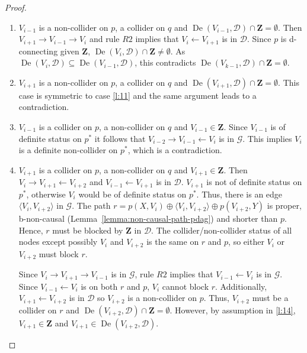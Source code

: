\documentclass[letterpaper]{article}
\theoremstyle{definition}
\theoremstyle{remark}
\DeclareMathOperator{\De}{De}
\newcommand{\g}[1][G]{\mathcal{#1}}
\newcommand{\pstar}[1][p]{{#1}^{*}}
\begin{document}
\begin{proof}
\begin{enumerate}[label=(\arabic*)]
\item\label{l:11}  $V_{i-1}$ is a non-collider on $p$, a collider on $q$ and $\De(V_{i-1},\g[D]) \cap \mathbf{Z} = \emptyset$.
Then $V_{i+1} \rightarrow V_{i-1} \rightarrow V_{i}$  and rule $R2$ implies that $V_{i} \leftarrow V_{i+1}$ is in $\g[D]$. Since $p$ is d-connecting given $\mathbf{Z}$, $\De(V_{i},\g[D]) \cap \mathbf{Z} \neq \emptyset$. As $\De(V_{i},\g[D]) \subseteq \De(V_{i-1},\g[D])$, this contradicts $\De(V_{k-1},\g[D]) \cap \mathbf{Z} = \emptyset$.

\item $V_{i+1}$ is a non-collider on $p$, a collider on $q$ and $\De(V_{i+1},\g[D]) \cap \mathbf{Z} = \emptyset$.
This case is symmetric to case \ref{l:11} and the same argument leads to a contradiction.

\item\label{l:13} $V_{i-1}$ is a collider on $p$, a non-collider on $q$ and $V_{i-1} \in \mathbf{Z}$.
Since $V_{i-1}$ is of definite status on $\pstar$ it follows that $V_{i-2} \rightarrow V_{i-1} \leftarrow V_{i}$ is in $\g$. This implies $V_{i}$ is a definite non-collider on $\pstar$, which is a contradiction.

\item\label{l:14} $V_{i+1}$ is a collider on $p$, a non-collider on $q$ and $V_{i+1} \in \mathbf{Z}$. Then $V_{i} \rightarrow V_{i+1} \leftarrow V_{i+2}$ and $V_{i-1} \leftarrow V_{i+1}$ is in $\g[D]$. $V_{i+1}$ is not of definite status on $\pstar$, otherwise $V_{i}$ would be of definite status on $\pstar$. 
Thus, there is an edge $\langle V_{i},V_{i+2} \rangle$ in $\g$. The path $r = p(X,V_{i}) \oplus \langle V_{i} , V_{i+2} \rangle \oplus p(V_{i+2},Y)$ is proper, b-non-causal (Lemma~\ref{lemma:non-causal-path-pdag}) and shorter than $p$. Hence, $r$ must be blocked by $\mathbf{Z}$ in $\g[D]$.  
The collider/non-collider status of all nodes except possibly $V_{i}$ and $V_{i+2}$ is the same on $r$ and $p$, so either $V_{i}$ or $V_{i+2}$ must block $r$.

Since $V_{i} \rightarrow V_{i+1} \rightarrow V_{i-1}$ is in $\g$, rule $R2$ implies that $V_{i-1} \leftarrow V_{i}$ is in $\g$. Since $V_{i-1} \leftarrow V_{i}$ is on both $r$ and $p$, $V_{i}$ cannot block $r$. 
Additionally, $V_{i+1} \leftarrow V_{i+2}$ is in $\g[D]$ so $V_{i+2}$ is a non-collider on $p$. Thus, $V_{i+2}$ must be a collider on $r$ and $\De(V_{i+2},\g[D]) \cap \mathbf{Z} = \emptyset$. However, by assumption in \ref{l:14}, $V_{i+1} \in \mathbf{Z}$ and $V_{i+1} \in \De(V_{i+2},\g[D])$.
\end{enumerate}


\end{proof}
\end{document}
